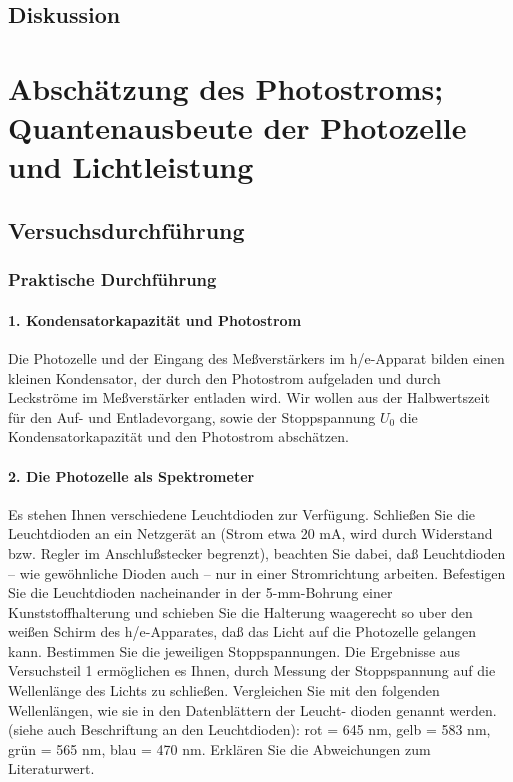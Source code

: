 \documentclass[12pt]{scrartcl}
\begin{document}
\subsection{Diskussion}

\section{Abschätzung des Photostroms; Quantenausbeute der Photozelle und Lichtleistung}
\subsection{Versuchsdurchführung}
\subsubsection{Praktische Durchführung}
\paragraph{1. Kondensatorkapazität und Photostrom}
Die Photozelle und der Eingang des Meßverstärkers im h/e-Apparat bilden einen kleinen Kondensator, der durch den Photostrom aufgeladen und durch Leckströme im Meßverstärker entladen wird.
Wir wollen aus der Halbwertszeit für den Auf- und Entladevorgang, sowie der Stoppspannung $U_0$ die Kondensatorkapazität und den Photostrom abschätzen. 

\paragraph{2. Die Photozelle als Spektrometer}
Es stehen Ihnen verschiedene Leuchtdioden zur Verfügung. Schließen Sie die Leuchtdioden an ein Netzgerät an
(Strom etwa 20 mA, wird durch Widerstand bzw. Regler im Anschlußstecker begrenzt), beachten Sie dabei, daß
Leuchtdioden -- wie gewöhnliche Dioden auch -- nur in einer Stromrichtung arbeiten.
Befestigen Sie die Leuchtdioden nacheinander in der 5-mm-Bohrung einer Kunststoffhalterung und schieben Sie
die Halterung waagerecht so uber den weißen Schirm des h/e-Apparates, daß das Licht auf die Photozelle gelangen
kann. Bestimmen Sie die jeweiligen Stoppspannungen.
Die Ergebnisse aus Versuchsteil 1 ermöglichen es Ihnen, durch Messung der Stoppspannung auf die Wellenlänge
des Lichts zu schließen. Vergleichen Sie mit den folgenden Wellenlängen, wie sie in den Datenblättern der Leucht-
dioden genannt werden. (siehe auch Beschriftung an den Leuchtdioden):
rot = 645 nm, gelb = 583 nm, grün = 565 nm, blau = 470 nm.
Erklären Sie die Abweichungen zum Literaturwert.
\end{document}
